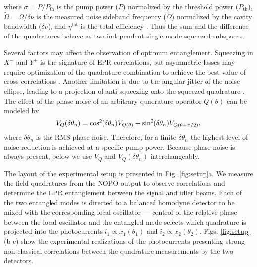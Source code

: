 \documentclass[final,twocolumn,english,prl,notitlepage,nofootinbib,floatfix,longbibliography,superscriptaddress
]{revtex4-2}
\begin{document}
where $\sigma = P/P_{\mathrm{th}}$ is the pump power ($P$) normalized by the threshold power ($P_{\mathrm{th}}$), $\tilde{\Omega}=\Omega/\delta\nu$ is the measured noise sideband frequency ($\Omega$) normalized  by the cavity bandwidth ($\delta\nu$), and $\eta^{\mathrm{tot}}$ is the total efficiency \cite{Drummond90,Schori2002}. Thus the sum and the difference of the quadratures behave as two independent single-mode squeezed subspaces.\par
Several factors may affect the observation of optimum entanglement. Squeezing in $X^-$ and $Y^+$ is the signature of EPR correlations, but asymmetric losses may require optimization of the quadrature combination to achieve the best value of cross-correlations \cite{Schori2002}. Another limitation is due to the angular jitter of the noise ellipse, leading to a  projection of anti-squeezing onto the squeezed quadrature \cite{Oelker2016}. The effect of the phase noise of an arbitrary quadrature operator $Q(\theta)$ can be modeled by 
\begin{equation}
\label{eq:ph_noise}
V_{Q}(\delta\theta_n) = \cos^2 (\delta\theta_n) V_{Q(\theta)} +\sin^2 (\delta\theta_n) V_{Q(\theta+\pi/2)},\\
\end{equation}
where $\delta\theta_n$ is the RMS phase noise. Therefore, for a finite $\delta\theta_n$ the highest level of noise reduction is achieved at a specific pump power. Because phase noise is always present, below we use  $V_{Q}$ and $V_{Q}(\delta\theta_n)$ interchangeably.\par

The layout of the experimental setup is presented in Fig. \ref{fig:setup}a. We measure the field quadratures from the NOPO output to observe correlations and determine the EPR entanglement between the signal and idler beams. Each of the two entangled modes is directed to a balanced homodyne detector to be mixed with the corresponding local oscillator --- control of the relative phase between the local oscillator and the entangled mode selects which quadrature is projected into the photocurrents $i_1 \varpropto x_1(\theta_1)$ and $i_2\varpropto x_2(\theta_2)$. Figs. \ref{fig:setup} (b-c) show the experimental realizations of the photocurrents presenting strong non-classical correlations between the quadrature measurements by the two detectors.\par
\end{document}

